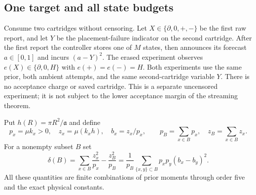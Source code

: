 \subsection{One target and all state budgets}
Consume two cartridges without censoring. Let $X\in\{\partial,0,+,-\}$
be the first raw report, and let $Y$ be the placement-failure indicator
on the second cartridge. After the first report the controller stores
one of $M$ states, then announces its forecast $a\in[0,1]$ and incurs
$(a-Y)^2$. The erased experiment observes
$e(X)\in\{\partial,0,H\}$ with $e(+)=e(-)=H$.
Both experiments use the same prior, both ambient attempts, and the same
second-cartridge variable $Y$. There is no acceptance charge or saved
cartridge. This is a separate uncensored experiment; it is not subject
to the lower acceptance margin of the streaming theorem.

Put $h(R)=\pi R^2/\mathfrak a$ and define
\[
 p_x=\mu k_x>0,\quad z_x=\mu(k_xh),\quad b_x=z_x/p_x,
 \qquad p_B=\sum_{x\in B}p_x,\quad z_B=\sum_{x\in B}z_x.
\]
For a nonempty subset $B$ set
\begin{equation}\label{eq:merge-cost}
 \delta(B)=\sum_{x\in B}\frac{z_x^2}{p_x}-\frac{z_B^2}{p_B}
 =\frac1{p_B}\sum_{\{x,y\}\subset B}p_xp_y(b_x-b_y)^2.
\end{equation}
All these quantities are finite combinations of prior moments through
order five and the exact physical constants.

